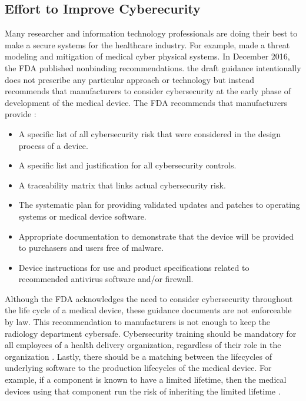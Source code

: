 \documentclass[pdf,bookmarks,colorlinks=true]{IEEEtran}
\begin{document}
\subsection{Effort to Improve Cyberecurity}
Many researcher and information technology professionals are doing their best to make a secure systems for the healthcare industry. For example, \cite{Almohri:2017:TMM:3204094.3204113} made a threat modeling and mitigation of medical cyber physical systems. In December 2016, the FDA published nonbinding recommendations. the draft guidance intentionally does not prescribe any particular approach or technology but instead recommends that manufacturers to consider cybersecurity at the early phase of development of the medical device. The FDA recommends that manufacturers provide \cite{fu2014controlling}: 
\begin{itemize}
	\item A specific list of all cybersecurity risk that were considered in the design process of a device.
	\item A specific list and justification for all cybersecurity controls.
	\item A traceability matrix that links actual cybersecurity risk.
	\item The systematic plan for providing validated updates and patches to operating systems or medical device software.
	\item Appropriate documentation to demonstrate that the device will be provided to purchasers and users free of malware.
	\item Device instructions for use and product specifications related to recommended antivirus software and/or firewall. 
\end{itemize}
Although the FDA acknowledges the need to consider cybersecurity throughout the life cycle of a medical device, these guidance documents are not enforceable by law. This recommendation to manufacturers is not enough to keep the radiology department cybersafe. Cybersecurity training should be mandatory for all employees of a health delivery organization, regardless of their role in the organization \cite{ferrara2019cybersecurity}. Lastly, there should be a matching between the lifecycles of underlying software to the production lifecycles of the medical device. For example, if a component is known to have a limited lifetime, then the medical devices using that component run the risk of inheriting the limited lifetime \cite{fu2014controlling}.
\end{document}
